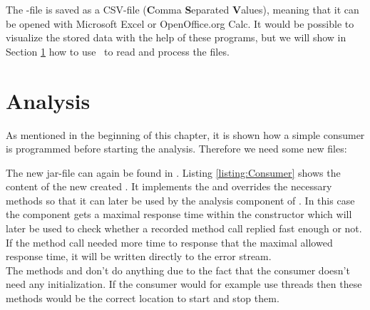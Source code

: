 \noindent The -file is saved as a CSV-file (\textbf{C}omma \textbf{S}eparated \textbf{V}alues), meaning that it can be opened with Microsoft Excel or OpenOffice.org Calc. It would be possible to visualize the stored data with the help of these programs, but we will show in Section \ref{sec:example:analysis} how to use \KiekerAnalysisPart\ to read and process the files.

\section{Analysis}\label{sec:example:analysis}
As mentioned in the beginning of this chapter, it is shown how a simple consumer is programmed before starting the analysis. Therefore we need some new files:
\begin{figure}[H]
\begin{graybox}
\end{graybox}
\end{figure}

\noindent The new jar-file can again be found in . Listing \ref{listing:Consumer} shows the content of the new created . It implements the  and overrides the necessary methods so that it can later be used by the analysis component of \Kieker. In this case the component gets a maximal response time within the constructor which will later be used to check whether a recorded method call replied fast enough or not. If the method call needed more time to response that the maximal allowed response time, it will be written directly to the error stream.\\
The methods  and  don't do anything due to the fact that the consumer doesn't need any initialization. If the consumer would for example use threads then these methods would be the correct location to start and stop them.

\setJavaCodeListing       



